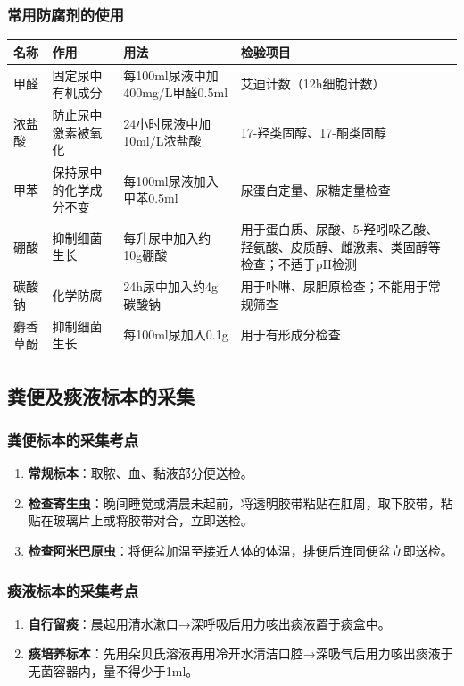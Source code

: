\documentclass[11pt, a4paper]{ctexart}
\begin{document}
\subsubsection{常用防腐剂的使用}
\begin{table}[htbp]
\centering
\begin{tabular}{|l|l|l|l|}
\hline
\textbf{名称} & \textbf{作用} & \textbf{用法} & \textbf{检验项目} \\
\hline
甲醛 & 固定尿中有机成分 & 每100ml尿液中加400mg/L甲醛0.5ml & 艾迪计数（12h细胞计数） \\
浓盐酸 & 防止尿中激素被氧化 & 24小时尿液中加10ml/L浓盐酸 & 17-羟类固醇、17-酮类固醇 \\
甲苯 & 保持尿中的化学成分不变 & 每100ml尿液加入甲苯0.5ml & 尿蛋白定量、尿糖定量检查 \\
硼酸 & 抑制细菌生长 & 每升尿中加入约10g硼酸 & 用于蛋白质、尿酸、5-羟吲哚乙酸、羟氨酸、皮质醇、雌激素、类固醇等检查；不适于pH检测 \\
碳酸钠 & 化学防腐 & 24h尿中加入约4g碳酸钠 & 用于卟啉、尿胆原检查；不能用于常规筛查 \\
麝香草酚 & 抑制细菌生长 & 每100ml尿加入0.1g & 用于有形成分检查 \\
\hline
\end{tabular}
\end{table}

\subsection{粪便及痰液标本的采集}
\subsubsection{粪便标本的采集考点}
\begin{enumerate}
    \item \textbf{常规标本}：取脓、血、黏液部分便送检。
    \item \textbf{检查寄生虫}：晚间睡觉或清晨未起前，将透明胶带粘贴在肛周，取下胶带，粘贴在玻璃片上或将胶带对合，立即送检。
    \item \textbf{检查阿米巴原虫}：将便盆加温至接近人体的体温，排便后连同便盆立即送检。
\end{enumerate}

\subsubsection{痰液标本的采集考点}
\begin{enumerate}
    \item \textbf{自行留痰}：晨起用清水漱口→深呼吸后用力咳出痰液置于痰盒中。
    \item \textbf{痰培养标本}：先用朵贝氏溶液再用冷开水清洁口腔→深吸气后用力咳出痰液于无菌容器内，量不得少于1ml。
\end{enumerate}
\end{document}
